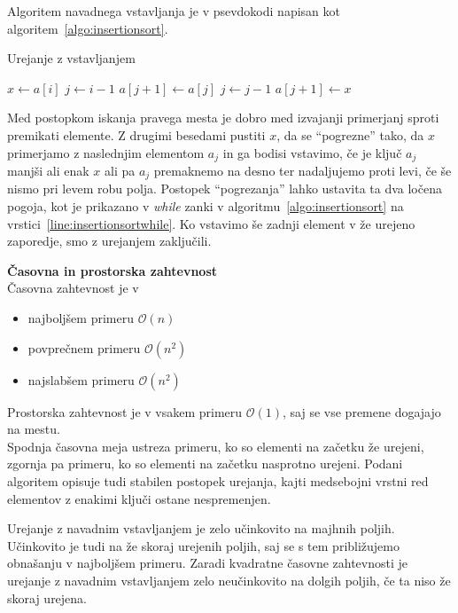 \documentclass[a4paper,oneside,12pt]{article}
\newcommand{\subsubsubsection}[1]{\vspace*{1ex}\textbf{#1}\\}
\begin{document}
Algoritem navadnega vstavljanja je v psevdokodi napisan kot algoritem~\ref{algo:insertionsort}.

\begin{algorithm}[h!t!]
  \caption{Urejanje z vstavljanjem}\label{algo:insertionsort}
  \begin{algorithmic}[1]
            \State $x \gets a[i]$
            \State $j \gets i - 1$
             \label{line:insertionsortwhile} 
                \State $a[j+1] \gets a[j]$
                \State $j \gets j - 1$
            \EndWhile
            \State $a[j+1] \gets x$
        \EndFor
    \EndFunction
  \end{algorithmic}
\end{algorithm}

Med postopkom iskanja pravega mesta je dobro med izvajanji primerjanj 
sproti premikati elemente. Z drugimi besedami pustiti $x$, da se ``pogrezne'' tako, da $x$
primerjamo z naslednjim elementom $a_j$ in ga bodisi vstavimo, če je ključ $a_j$ manjši
ali enak $x$ ali pa $a_j$ premaknemo na desno ter nadaljujemo proti levi, če še nismo pri
levem robu polja. Postopek ``pogrezanja'' lahko ustavita ta dva ločena
pogoja, kot je prikazano v \emph{while} zanki v
algoritmu~\ref{algo:insertionsort} na vrstici~\ref{line:insertionsortwhile}.  Ko vstavimo še zadnji element v že 
urejeno zaporedje, smo z urejanjem zaključili.

\subsubsubsection{Časovna in prostorska zahtevnost} \nopagebreak
Časovna zahtevnost je v 
\begin{itemize}
  \item najboljšem primeru $\mathcal{O}(n)$
  \item povprečnem primeru $\mathcal{O}(n^2)$
  \item najslabšem primeru $\mathcal{O}(n^2)$
\end{itemize}

Prostorska zahtevnost je v vsakem primeru $\mathcal{O}(1)$, saj se vse premene dogajajo na
mestu.\\

Spodnja časovna meja ustreza primeru, ko so elementi na začetku že urejeni, zgornja pa primeru,
ko so elementi na začetku nasprotno urejeni. Podani algoritem opisuje tudi stabilen postopek urejanja, kajti medsebojni
vrstni red elementov z enakimi ključi ostane nespremenjen.

Urejanje z navadnim vstavljanjem je zelo učinkovito na majhnih poljih. Učinkovito je tudi na že
skoraj urejenih poljih, saj se s tem približujemo obnašanju v najboljšem primeru.
Zaradi kvadratne časovne zahtevnosti je urejanje z navadnim vstavljanjem zelo neučinkovito na
dolgih poljih, če ta niso že skoraj urejena.
\end{document}
